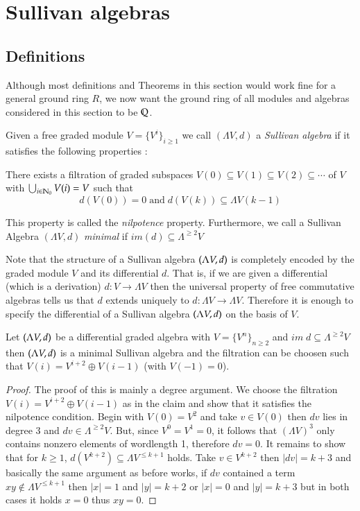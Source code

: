 \section{Sullivan algebras}

\subsection{Definitions}
Although most definitions and Theorems in this section would work fine for a general ground ring $R$, we now want the
ground ring of all modules and algebras considered in this section to be $\mathbb{Q}$.

\begin{Definition}
 Given a free graded module $V = {\lbrace {V^i}\rbrace}_{ i \geq 1} $ we call $(\Lambda V, d)$ a \emph{Sullivan algebra} 
 if it satisfies the following properties :
 
  There exists a filtration of graded subspaces $V(0) \subseteq V(1) \subseteq V(2) \subseteq \cdots $ of $V$
  with $\bigcup_{i \in \mathbb{N}_0} V(i) = V$ such that 
  $$ d(V(0)) = 0 \; \text{and} \; d( V(k)) \subseteq  \Lambda V(k-1) $$
  
 This property is called the \emph{nilpotence} property.
 Furthermore, we call a Sullivan Algebra $(\Lambda V,d)$ \emph{minimal} if $im(d) \subseteq \Lambda^{\geq 2} V$
\end{Definition}

Note that the structure of a Sullivan algebra $(\Lambda V,d)$ is completely encoded by the graded module $V$ and its
differential $d$. That is, if we are given a differential (which is a derivation) $d \colon V \to \Lambda V$ then the
universal property of free commutative algebras tells us that $d$ extends uniquely to $d \colon \Lambda V \to \Lambda V$.
Therefore it is enough to specify the differential of a Sullivan algebra $(\Lambda V,d)$ on the basis of $V$.


\begin{Proposition}
\label{prop:WellBehavedFiltrations}
 Let $(\Lambda V,d)$ be a differential graded algebra with $V = {\lbrace V^n \rbrace}_{n \geq 2}$ and 
 ${im \;d \subseteq \Lambda^{\geq 2} V}$ then $(\Lambda V,d)$ is a minimal Sullivan algebra and
 the filtration can be choosen such that $V(i) = V^{i+2} \oplus V(i-1)$ (with $V(-1) = 0$).
\end{Proposition}
\begin{proof}
 The proof of this is mainly a degree argument. We choose the filtration ${V(i) = V^{i+2} \oplus V(i-1)}$ as in the claim
 and show that it satisfies
 the nilpotence condition. Begin with $V(0) = V^2$ and take $v \in V(0)$ then $dv$ lies in
 degree $3$ and $dv \in \Lambda^{\geq 2} V$. But, since $V^0 = V^1 = 0$, it follows that $(\Lambda V)^3$ only contains 
 nonzero elements of wordlength 1, therefore $dv = 0$. 
 It remains to show that for $k \geq 1$, $d(V^{k+2}) \subseteq \Lambda V^{ \leq k+1}$ holds. Take $v \in V^{ k+2}$ then 
 $| dv | = k + 3$ and basically the same argument as before works, if $dv$ contained a term $xy \notin \Lambda V^{\leq k+1}$
 then $|x| = 1$ and $|y| = k + 2$ or $|x| = 0$ and $|y| = k + 3$ but in both cases it holds $x = 0$ thus $xy = 0$.
\end{proof}

